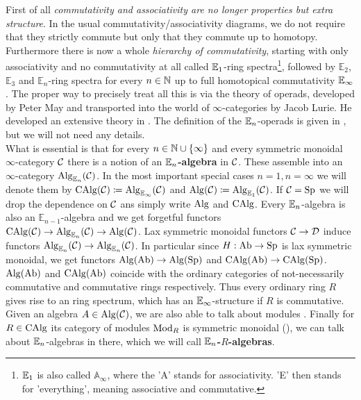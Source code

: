 First of all \textit{commutativity and associativity are no longer  properties but extra structure}. In the usual commutativity/associativity diagrams, we do not require that they strictly commute but only that they commute up to homotopy. 
Furthermore there is now a whole \textit{hierarchy of commutativity}, starting with only associativity and no commutativity at all called $\mathbb{E}_1$-ring spectra\footnote{$\mathbb{E}_1$ is also called $\mathbb{A}_\infty$, where the 'A' stands for associativity. 'E' then stands for 'everything', meaning associative and commutative.}, followed by $\mathbb{E}_2$, $\mathbb{E}_3$ and $\mathbb{E}_n$-ring spectra for every $n\in \mathbb{N}$ up to full homotopical commutativity $\mathbb{E}_\infty$. 
The proper way to precisely treat all this is via the theory of operads, developed by Peter May and transported into the world of $\infty$-categories by Jacob Lurie. 
He developed an extensive theory in \cite[Chapter~2,3,4]{lurie2017higher}. The definition of the $\mathbb{E}_n$-operads is given in \cite[Definition~5.1.0.2]{lurie2017higher}, but we will not need any details. \\
What is essential is that for every $n\in\mathbb{N}\cup\{\infty\}$ and every symmetric monoidal $\infty$-category $\mathcal{C}$ there is a notion of an \textbf{$\mathbb{E}_n$-algebra} in $\mathcal{C}$. 
These assemble into an $\infty$-category $\operatorname{Alg}_{\mathbb{E}_n}(\mathcal{C})$. 
In the most important special cases $n=1,n=\infty$ we will denote them by $\operatorname{CAlg}(\mathcal{C})\coloneqq \operatorname{Alg}_{\mathbb{E}_\infty}(\mathcal{C})$ and $\operatorname{Alg}(\mathcal{C})\coloneqq \operatorname{Alg}_{\mathbb{E}_1}(\mathcal{C})$. If $\mathcal{C}=\operatorname{Sp}$ we will drop the dependence on $\mathcal{C}$ ans simply write $\operatorname{Alg}$ and $\operatorname{CAlg}$.
Every $\mathbb{E}_n$-algebra is also an $\mathbb{E}_{n-1}$-algebra and we get forgetful functors $\operatorname{CAlg}(\mathcal{C})\rightarrow \operatorname{Alg}_{\mathbb{E}_n}(\mathcal{C})\rightarrow \operatorname{Alg}(\mathcal{C})$. 
Lax symmetric monoidal functors $\mathcal{C}\rightarrow\mathcal{D}$ induce functors $\operatorname{Alg}_{\mathbb{E}_n}(\mathcal{C})\rightarrow \operatorname{Alg}_{\mathbb{E}_n}(\mathcal{C})$. In particular since $H:\operatorname{Ab}\rightarrow\operatorname{Sp}$ is lax symmetric monoidal, we get functors $\operatorname{Alg}(\operatorname{Ab})\rightarrow \operatorname{Alg}(\operatorname{Sp})$ and  $\operatorname{CAlg}(\operatorname{Ab})\rightarrow \operatorname{CAlg}(\operatorname{Sp})$. $\operatorname{Alg}(\operatorname{Ab})$ and $\operatorname{CAlg}(\operatorname{Ab})$ coincide with the ordinary categories of not-necessarily commutative and commutative rings respectively. Thus every ordinary ring $R$ gives rise to an ring spectrum, which has an $\mathbb{E}_\infty$-structure if $R$ is commutative.
\\
Given an algebra $A\in \operatorname{Alg}(\mathcal{C})$, we are also able to talk about modules \cite[Definition~4.2.1.13]{lurie2017higher}.
Finally for $R\in \operatorname{CAlg}$ its category of modules $\operatorname{Mod}_R$ is symmetric monoidal (\cite[Theorem~4.5.2.1]{lurie2017higher}), we can talk about $\mathbb{E}_n$-algebras in there, which we will call \textbf{$\mathbb{E}_n$-$R$-algebras}.  
\\
